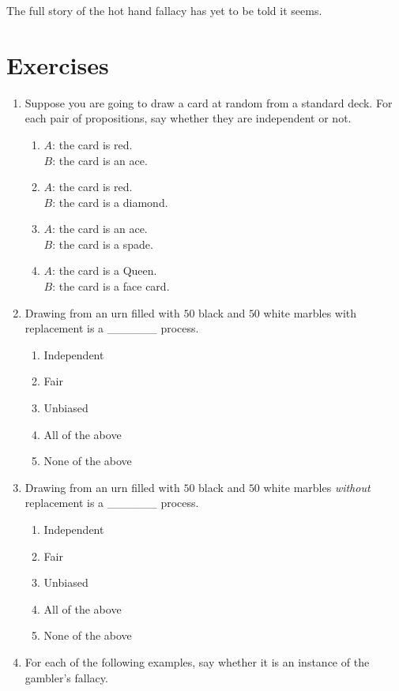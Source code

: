 \documentclass[justified]{tufte-book}
\providecommand{\tightlist}{%
  \setlength{\itemsep}{0pt}\setlength{\parskip}{0pt}}
\theoremstyle{definition}
\theoremstyle{definition}
\theoremstyle{definition}
\theoremstyle{remark}
\begin{document}
The full story of the hot hand fallacy has yet to be told it seems.

\hypertarget{exercises-3}{%
\section*{Exercises}\label{exercises-3}}

\begin{enumerate}
\item
  Suppose you are going to draw a card at random from a standard deck.
  For each pair of propositions, say whether they are independent or
  not.

  \begin{enumerate}
  \def\labelenumii{\alph{enumii}.}
  \item
    \(A\): the card is red.\\
    \(B\): the card is an ace.
  \item
    \(A\): the card is red.\\
    \(B\): the card is a diamond.
  \item
    \(A\): the card is an ace.\\
    \(B\): the card is a spade.
  \item
    \(A\): the card is a Queen.\\
    \(B\): the card is a face card.
  \end{enumerate}
\item
  Drawing from an urn filled with \(50\) black and \(50\) white marbles
  with replacement is a \_\_\_\_\_\_ process.

  \begin{enumerate}
  \def\labelenumii{\alph{enumii}.}
  \tightlist
  \item
    Independent
  \item
    Fair
  \item
    Unbiased
  \item
    All of the above
  \item
    None of the above
  \end{enumerate}
\item
  Drawing from an urn filled with \(50\) black and \(50\) white marbles
  \emph{without} replacement is a \_\_\_\_\_\_ process.

  \begin{enumerate}
  \def\labelenumii{\alph{enumii}.}
  \tightlist
  \item
    Independent
  \item
    Fair
  \item
    Unbiased
  \item
    All of the above
  \item
    None of the above
  \end{enumerate}
\item
  For each of the following examples, say whether it is an instance of
  the gambler's fallacy.


\end{enumerate}
\end{document}
